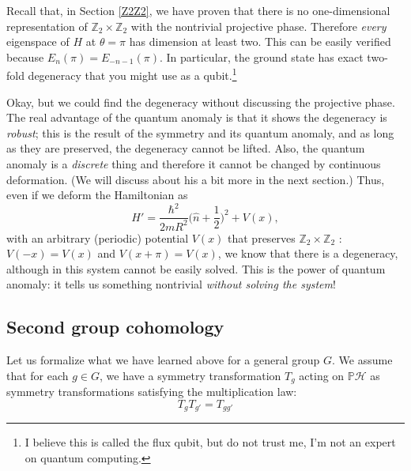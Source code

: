 \documentclass[
]{scrartcl}
\numberwithin{equation}{section}
\theoremstyle{definition}
\theoremstyle{definition}
\theoremstyle{definition}
\theoremstyle{definition}
\theoremstyle{remark}
\begin{document}
Recall that, in Section \ref{Z2Z2}, we have proven that there is no one-dimensional representation of \(\mathbb{Z}_2\times \mathbb{Z}_2\) with the nontrivial projective phase. Therefore \emph{every} eigenspace of \(H\) at \(\theta = \pi\) has dimension at least two. This can be easily verified because \(E_n(\pi) = E_{-n-1}(\pi)\). In particular, the ground state has exact two-fold degeneracy that you might use as a qubit.\footnote{I believe this is called the flux qubit, but do not trust me, I'm not an expert on quantum computing.}

Okay, but we could find the degeneracy without discussing the projective phase. The real advantage of the quantum anomaly is that it shows the degeneracy is \emph{robust}; this is the result of the symmetry and its quantum anomaly, and as long as they are preserved, the degeneracy cannot be lifted.
Also, the quantum anomaly is a \emph{discrete} thing and therefore it cannot be changed by continuous deformation. (We will discuss about his a bit more in the next section.)
Thus, even if we deform the Hamiltonian as
\begin{equation}
  \label{eq:ABringHamDef}
  H' = \frac{\hbar^2}{2mR^2}\bigl(\hat{n} + \frac{1}{2} \bigr)^2 + V(x),
\end{equation}
with an arbitrary (periodic) potential \(V(x)\) that preserves \(\mathbb{Z}_2\times \mathbb{Z}_2\) : \(V(-x) = V(x)\) and \(V(x+\pi) = V(x)\),
we know that there is a degeneracy, although in this system cannot be easily solved.
This is the power of quantum anomaly: it tells us something nontrivial \emph{without solving the system}!

\hypertarget{second-group-cohomology}{%
\subsection{Second group cohomology}\label{second-group-cohomology}}

Let us formalize what we have learned above for a general group \(G\).
We assume that for each \(g\in G\), we have a symmetry transformation \(T_g\) acting on \(\mathbb{P}\mathcal{H}\) as symmetry transformations satisfying the multiplication law:
\begin{equation}
  \label{eq:Tmult}
  T_g T_{g'} = T_{gg'}
\end{equation}
\end{document}
